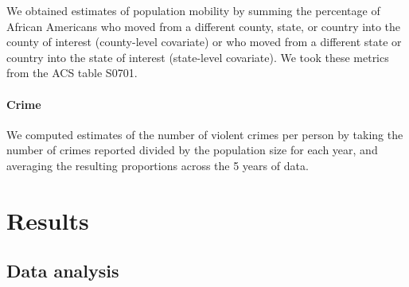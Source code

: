 \documentclass[english,floatsintext,man]{apa6}
\theoremstyle{definition}
\theoremstyle{definition}
\theoremstyle{remark}
\begin{document}
We obtained estimates of population mobility by summing the percentage
of African Americans who moved from a different county, state, or
country into the county of interest (county-level covariate) or who
moved from a different state or country into the state of interest
(state-level covariate). We took these metrics from the ACS table S0701.

\paragraph{Crime}\label{crime}

We computed estimates of the number of violent crimes per person by
taking the number of crimes reported divided by the population size for
each year, and averaging the resulting proportions across the 5 years of
data.

\section{Results}\label{results}

\subsection{Data analysis}\label{data-analysis}
\end{document}
